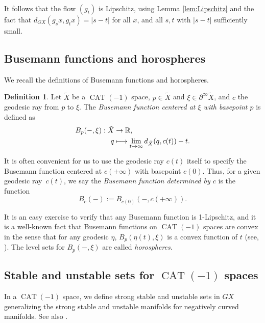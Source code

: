 \documentclass[JEP,XML,SOM,Unicode,NoFloatCountersInSection]{cedram}
\def\mto{\mathchoice{\longmapsto}{\mapsto}{\mapsto}{\mapsto}}
\theoremstyle{definition}
\newtheorem{defn}[thm]{Definition}
\numberwithin{equation}{section}
\DeclareMathOperator{\CAT}{CAT}
\begin{document}
It follows that the flow $(g_t)$ is Lipschitz, using Lemma \ref{lem:Lipschitz} and the fact that $d_{GX}(g_sx, g_tx) = |s-t|$ for all $x$, and all $s, t$ with $|s-t|$ sufficiently small.

\subsection{Busemann functions and horospheres}

We recall the definitions of Busemann functions and horospheres.

\begin{defn}
Let $\tilde X$ be a $\CAT(-1)$ space, $p\in \tilde X$ and $\xi\in \partial^\infty\tilde X$, and $c$ the geodesic ray from $p$ to $\xi$. The \emph{Busemann function centered at $\xi$ with basepoint $p$} is defined as
\begin{align*}
B_p(-,\xi): \tilde X &\to \mathbb{R},\\
q &\mto \lim_{t\to\infty} d_{\tilde X}(q,c(t))-t.
\end{align*}
\end{defn}

It is often convenient for us to use the geodesic ray $c(t)$ itself to specify the Busemann function centered at $c(+\infty)$ with basepoint $c(0)$. Thus, for a given geodesic ray~$c(t)$, we say the \emph{Busemann function determined by $c$} is the function
\[
B_c(-):= B_{c(0)} (-, c(+\infty)).
\]

It is an easy exercise to verify that any Busemann function is 1-Lipschitz, and it is a well-known fact that Busemann functions on $\CAT(-1)$ spaces are convex in the sense that for any geodesic $\eta$, $B_p(\eta(t),\xi)$ is a convex function of $t$ (see, \eg \cite[Prop.\,II.8.22]{bh}). The level sets for $B_p(-,\xi)$ are called \emph{horospheres}.

\subsection{Stable and unstable sets for $\CAT(-1)$ spaces}

In a $\CAT(-1)$ space, we define strong stable and unstable sets in $G X$ generalizing the strong stable and unstable manifolds for negatively curved manifolds. See also \cite[\S2.8]{mB95}.
\end{document}
